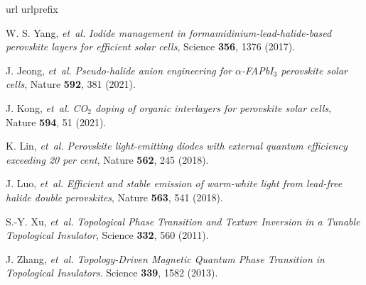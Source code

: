 \documentclass[onecolumn,preprint,superscriptaddress]{revtex4-1}
\begin{document}
\begin{thebibliography}{10}
	\expandafter\ifx\csname url\endcsname\relax
	\def\url#1{\texttt{#1}}\fi
	\expandafter\ifx\csname urlprefix\endcsname\relax\def\urlprefix{URL }\fi
	\providecommand{\bibinfo}[2]{#2}
	\providecommand{\eprint}[2][]{\url{#2}}

	\bibinfo{author}{W. S. Yang,} \emph{et~al.}
	\newblock \emph{\bibinfo{title}{Iodide management in formamidinium-lead-halide-based perovskite layers for efficient solar cells}},
	\newblock \bibinfo{journal}{Science} \textbf{\bibinfo{volume}{356}},
	\bibinfo{pages}{1376} (\bibinfo{year}{2017}).

	\bibinfo{author}{J. Jeong,} \emph{et~al.}
	\newblock \emph{\bibinfo{title}{Pseudo-halide anion engineering for ${\alpha}$-FAPbI$_3$ perovskite solar cells}},
	\newblock \bibinfo{journal}{Nature} \textbf{\bibinfo{volume}{592}},
	\bibinfo{pages}{381} (\bibinfo{year}{2021}).

	\bibinfo{author}{J. Kong,} \emph{et~al.}
	\newblock \emph{\bibinfo{title}{CO$_2$ doping of organic interlayers for perovskite solar cells}},
	\newblock \bibinfo{journal}{Nature} \textbf{\bibinfo{volume}{594}},
	\bibinfo{pages}{51} (\bibinfo{year}{2021}).

	\bibinfo{author}{K. Lin,} \emph{et~al.}
	\newblock \emph{\bibinfo{title}{Perovskite light-emitting diodes with external quantum efficiency exceeding 20 per cent}},
	\newblock\bibinfo{journal}{Nature} \textbf{\bibinfo{volume}{562}},
	\bibinfo{pages}{245} (\bibinfo{year}{2018}).

	\bibinfo{author}{J. Luo,} \emph{et~al.}
	\newblock \emph{\bibinfo{title}{Efficient and stable emission of warm-white light from lead-free halide double perovskites}},
	\newblock \bibinfo{journal}{Nature} \textbf{\bibinfo{volume}{563}},
	\bibinfo{pages}{541} (\bibinfo{year}{2018}).

	\bibinfo{author}{S.-Y. Xu,} \emph{et~al.}
	\newblock \emph{\bibinfo{title}{Topological Phase Transition and Texture Inversion in a Tunable Topological Insulator}},
	\newblock \bibinfo{journal}{Science} \textbf{\bibinfo{volume}{332}},
	\bibinfo{pages}{560} (\bibinfo{year}{2011}).

	\bibinfo{author}{J. Zhang,} \emph{et~al.}
	\newblock \emph{\bibinfo{title}{Topology-Driven Magnetic Quantum Phase Transition in Topological Insulators}}.
	\newblock \bibinfo{journal}{Science} \textbf{\bibinfo{volume}{339}},
	\bibinfo{pages}{1582} (\bibinfo{year}{2013}).


\end{thebibliography}
\end{document}
